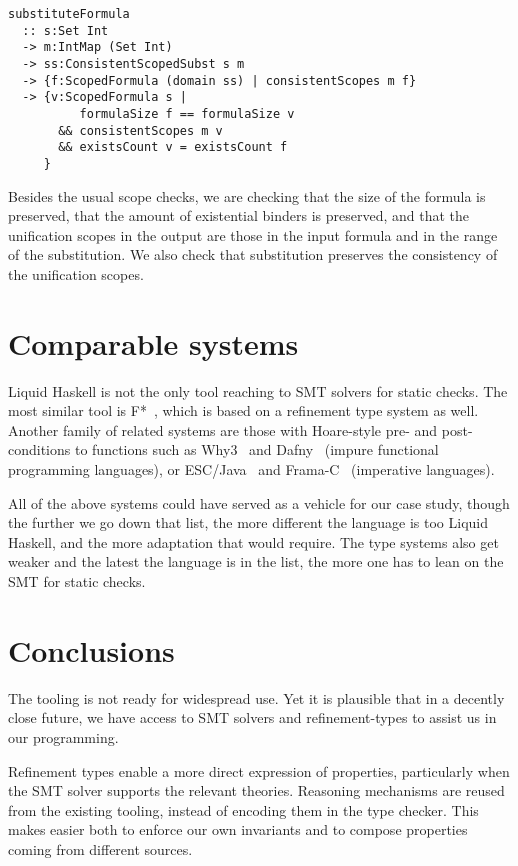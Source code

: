 \documentclass[sigconf]{acmart}
\begin{document}
\begin{verbatim}
substituteFormula
  :: s:Set Int
  -> m:IntMap (Set Int)
  -> ss:ConsistentScopedSubst s m
  -> {f:ScopedFormula (domain ss) | consistentScopes m f}
  -> {v:ScopedFormula s |
          formulaSize f == formulaSize v
       && consistentScopes m v
       && existsCount v = existsCount f
     }
\end{verbatim}
Besides the usual scope checks, we are checking that the size of the formula
is preserved, that the amount of existential binders is preserved, and that
the unification scopes in the output are those in the input formula and in
the range of the substitution. We also check that substitution preserves
the consistency of the unification scopes.

\section{Comparable systems}

Liquid Haskell is not the only tool reaching to SMT solvers for static checks.
The most similar tool is F*~\cite{swamy16}, which is based on a refinement type
system as well. Another family of related systems are those with Hoare-style
pre- and post-conditions to functions such as Why3~\cite{filli13} and
Dafny~\cite{leino17} (impure functional programming languages), or
ESC/Java~\cite{flanagan02} and Frama-C~\cite{kosmatov24} (imperative languages).

All of the above systems could have served as a vehicle for our case study,
though the further we go down that list, the more different the language is too
Liquid Haskell, and the more adaptation that would require. The type systems
also get weaker and the latest the language is in the list, the more one has to
lean on the SMT for static checks.

\section{Conclusions}
\label{conclusions}

The tooling is not ready for widespread use. Yet it is plausible that in a decently
close future, we have access to SMT solvers and refinement-types to assist us in
our programming.

Refinement types enable a more direct expression of properties,
particularly when the SMT solver supports the relevant theories. Reasoning
mechanisms are reused from the existing tooling, instead of encoding them
in the type checker. This makes easier both to enforce our own invariants and to
compose properties coming from different sources.
\end{document}
